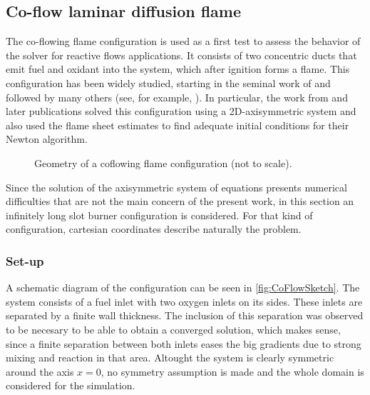 
\subsection{Co-flow laminar diffusion flame}\label{ssec:coflowFlame}
The co-flowing flame configuration is used as a first test to assess the behavior of the solver for reactive flows applications. It consists of two concentric ducts that emit fuel and oxidant into the system, which after ignition forms a flame. This configuration has been widely studied, starting in the seminal work of \cite{burkeDiffusionFlames1928} and followed by many others (see, for example, \cite{smookeNumericalModelingAxisymmetric1992, smookeNumericalSolutionTwoDimensional1986,braackAdaptiveFiniteElement1997}). In particular, the work from \cite{smookeNumericalModelingAxisymmetric1992} and later publications solved this configuration using a 2D-axisymmetric system and also used the flame sheet estimates to find adequate initial conditions for their Newton algorithm. 
\begin{figure}[t]
	\centering
	\def\svgwidth{0.38\textwidth}
	\qquad\quad
	\def\svgwidth{0.35\textwidth}
	\caption{Geometry of a coflowing flame configuration (not to scale).} \label{fig:CoFlowGeometry}
\end{figure}

Since the solution of the axisymmetric system of equations presents numerical difficulties that are not the main concern of the present work, in this section an infinitely long slot burner configuration is considered. For that kind of configuration, cartesian coordinates describe naturally the problem. 
\subsubsection{Set-up}
A schematic diagram of the configuration can be seen in \cref{fig:CoFlowSketch}. The system consists of a fuel inlet with two oxygen inlets on its sides. These inlets are separated by a finite wall thickness. The inclusion of this separation was observed to be necesary to be able to obtain a converged solution, which makes sense, since a finite separation between both inlets eases the big gradients due to strong mixing and reaction in that area. Altought the system is clearly symmetric around the axis $x = 0$, no symmetry assumption is made and the whole domain is considered for the simulation.

